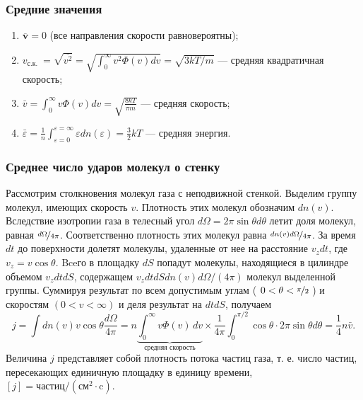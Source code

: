 \subsubsection{Средние значения}
\begin{enumerate}
	\item $\overline{\mathbf{v}}=0$ (все направления скорости равновероятны);
	\item $v_{\text {с.к. }}=\sqrt{\overline{v^2}}=\sqrt{\int_0^{\infty} v^2 \Phi(v) d v}=\sqrt{3 k T / m}$ — средняя квадратичная скорость;
	\item $\bar{v}=\int_0^{\infty} v \Phi(v) d v=\sqrt{\frac{8 k T}{\pi m}}$ — средняя скорость;
	\item $\bar{\varepsilon}=\frac{1}{n} \int_{\varepsilon=0}^{\varepsilon=\infty} \varepsilon d n(\varepsilon)=\frac{3}{2} k T$ — средняя энергия.
\end{enumerate}

\subsubsection{Среднее число ударов молекул о стенку}
Рассмотрим столкновения молекул газа с неподвижной стенкой. Выделим группу молекул, имеющих скорость $v$. Плотность этих молекул обозначим $d n(v)$. Вследствие изотропии газа в телесный угол $d \Omega=2 \pi \sin \theta d \theta$ летит доля молекул, равная $\nicefrac{d \Omega}{4 \pi}$. Соответственно плотность этих молекул равна $\nicefrac{dn(v) d \Omega}{4 \pi}$. За время $dt$ до поверхности долетят молекулы, удаленные от нее на расстояние $v_z d t$, где $v_z=v \cos \theta$. Bceго в площадку $d S$ попадут молекулы, находящиеся в цилиндре объемом $v_z d t d S$, содержащем $v_z d t d S d n(v) d \Omega /(4 \pi)$ молекул выделенной группы. Суммируя результат по всем допустимым углам ( $0<\theta<\nicefrac{\pi}{2}$ ) и скоростям $(0<v<\infty)$ и деля результат на $d t d S$, получаем
\begin{equation}
j=\int d n(v) v \cos \theta \frac{d \Omega}{4 \pi}=n \underbrace{\int_0^{\infty} v \Phi(v) \, d v}_{\text{средняя скорость}} \times \frac{1}{4 \pi} \int_0^{\pi / 2} \cos \theta \cdot 2 \pi \sin \theta d \theta=\frac{1}{4} n \bar{v} .
\label{eq:mean-count-mxwl}
\end{equation}
Величина $j$ представляет собой плотность потока частиц газа, т. е. число частиц, пересекающих единичную площадку в единицу времени, $[j]= \text{частиц}/\left(\text{см}^2 \cdot \text{c}\right)$.


